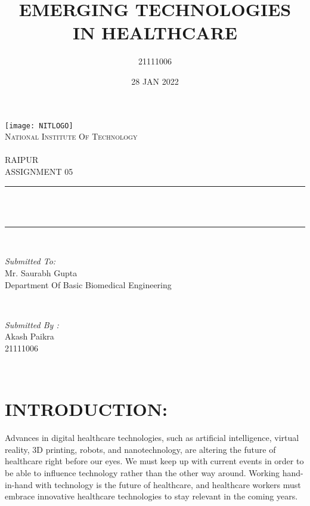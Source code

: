 \documentclass[12pt]{article}
\title{EMERGING TECHNOLOGIES IN HEALTHCARE}\newline \\\\\\
\author{21111006}
\date{28 JAN 2022}
\makeatletter
\let\thetitle\@title
\makeatother
\begin{document}
\begin{titlepage}
	\centering
    \texttt{[image: NITLOGO]}\\[1.0 cm]	
    \textsc{\LARGE National Institute Of Technology \newline\\\\ RAIPUR}\\[2.0 CM]
    
	\textsc{\Large ASSIGNMENT 05}\\[0.5 cm]				%
	\rule{\linewidth}{0.4 mm} \\[0.4 cm]
	{ \huge \bfseries \thetitle}\\
	\rule{\linewidth}{0.4 mm} \\[1.5 cm]
	
	\begin{minipage}{0.6\textwidth}
		\begin{flushleft} \large
			\emph{Submitted To:}\\
			Mr. Saurabh Gupta\\
            Department Of Basic Biomedical Engineering\\
			\end{flushleft}
			\end{minipage}~
			\begin{minipage}{0.4\textwidth}
            
			\begin{flushright} \large
			\emph{Submitted By :}\\
			Akash Paikra\\
            21111006\\
		\end{flushright}
        
	\end{minipage}\\[2 cm]
\end{titlepage}

\tableofcontents
\pagebreak







\section{INTRODUCTION:}

Advances in digital healthcare technologies, such as artificial intelligence, virtual reality, 3D printing, robots, and nanotechnology, are altering the future of healthcare right before our eyes. We must keep up with current events in order to be able to influence technology rather than the other way around. Working hand-in-hand with technology is the future of healthcare, and healthcare workers must embrace innovative healthcare technologies to stay relevant in the coming years.
\end{document}
